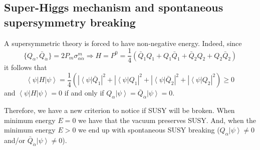 \documentclass[a4paper,12pt]{article}
\numberwithin{equation}{section}
\numberwithin{exe}{section}
\newcommand{\Qb}{{\bar Q}}
\renewcommand{\a}{{\alpha}}
\newcommand{\ad}{{\dot\alpha}}
\newcommand{\s}{{\sigma}}
\begin{document}
\subsection{Super-Higgs mechanism and spontaneous supersymmetry breaking}
A supersymmetric theory is forced to have non-negative energy. Indeed, since
	\begin{equation}
	\{Q_\a, \Qb_\ad\} = 2P_m\s^m_{\a\ad} \Rightarrow H=P^0= \frac14(\Qb_1 Q_1 + Q_1\Qb_1 + \Qb_2 Q_2 + Q_2\Qb_2)
	\end{equation}
it follows that
	\begin{equation}
	\left<\psi\right|H\left|\psi\right> = \frac14 \left( |\left<\psi\right|\Qb_1|^2 + |\left<\psi\right|Q_1|^2 + |\left<\psi\right|\Qb_2|^2 + |\left<\psi\right|Q_2|^2 \right) \geq 0
	\end{equation}
and $\left<\psi\right|H\left|\psi\right>=0$ if and only if $Q_\a\left|\psi\right> = \Qb_\ad\left|\psi\right>=0$.

Therefore, we have a new criterion to notice if SUSY will be broken. When minimum energy $E=0$ we have that the vacuum preserves SUSY. And, when the minimum energy $E>0$ we end up with spontaneous SUSY breaking ($Q_\a\left|\psi\right>\neq 0$ and/or $\Qb_\ad\left|\psi\right>\neq 0$).
\end{document}
